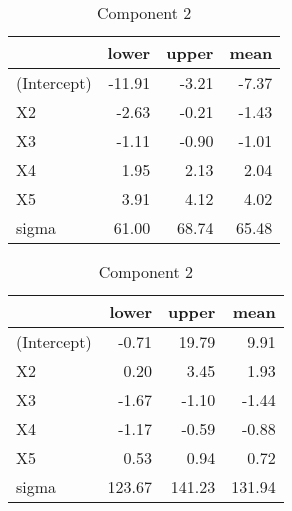 \documentclass[10pt]{olplainarticle}\usepackage[]{graphicx}\usepackage[]{color}
\begin{document}
% 
% 


\begin{table}[!htb]
    \begin{minipage}{.5\linewidth}
      \caption{Component 1} \label{t1}
      \centering 
\begin{tabular}{lrrr}
\toprule
  & lower & upper & mean\\
\midrule
(Intercept) & -11.91 & -3.21 & -7.37\\
X2 & -2.63 & -0.21 & -1.43\\
X3 & -1.11 & -0.90 & -1.01\\
X4 & 1.95 & 2.13 & 2.04\\
X5 & 3.91 & 4.12 & 4.02\\
\addlinespace
sigma & 61.00 & 68.74 & 65.48\\
\bottomrule
\end{tabular} \end{minipage}%
    \begin{minipage}{0.7\linewidth}
      \centering
        \caption{Component 2} \label{t2} 
\begin{tabular}{lrrr}
\toprule
  & lower & upper & mean\\
\midrule
(Intercept) & -0.71 & 19.79 & 9.91\\
X2 & 0.20 & 3.45 & 1.93\\
X3 & -1.67 & -1.10 & -1.44\\
X4 & -1.17 & -0.59 & -0.88\\
X5 & 0.53 & 0.94 & 0.72\\
\addlinespace
sigma & 123.67 & 141.23 & 131.94\\
\bottomrule
\end{tabular} \end{minipage} 
\end{table}\begin{table}[!htb]

\end{table}
\end{document}
